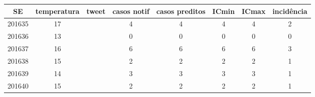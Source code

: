 \begin{tabular}{c|ccccccc}
  \hline
SE & temperatura & tweet & casos notif & casos preditos & ICmin & ICmax & incidência \\ 
  \hline
201635 & 17 &  & 4 & 4 & 4 & 4 & 2 \\ 
  201636 & 13 &  & 0 & 0 & 0 & 0 & 0 \\ 
  201637 & 16 &  & 6 & 6 & 6 & 6 & 3 \\ 
  201638 & 15 &  & 2 & 2 & 2 & 2 & 1 \\ 
  201639 & 14 &  & 3 & 3 & 3 & 3 & 1 \\ 
  201640 & 15 &  & 2 & 2 & 2 & 2 & 1 \\ 
   \hline
\end{tabular}
